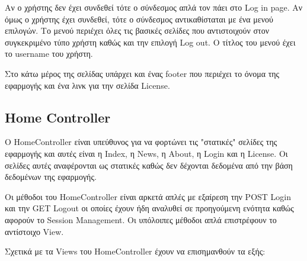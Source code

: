 \documentclass[12pt]{article}
\begin{document}
Αν ο χρήστης δεν έχει συνδεθεί τότε ο σύνδεσμος απλά τον πάει στο Log in page. Αν όμως ο χρήστης έχει συνδεθεί, τότε ο σύνδεσμος αντικαθίσταται με ένα μενού επιλογών. Το μενού περιέχει όλες τις βασικές σελίδες που αντιστοιχούν στον συγκεκριμένο τύπο χρήστη καθώς και την επιλογή Log out. Ο τίτλος του μενού έχει το username του χρήστη.

Στο κάτω μέρος της σελίδας υπάρχει και ένας footer που περιέχει το όνομα της εφαρμογής και ένα λινκ για την σελίδα License.

\subsection{Home Controller}
Ο HomeController είναι υπεύθυνος για να φορτώνει τις "στατικές" σελίδες της εφαρμογής και αυτές είναι η Index, η News, η About, η Login και η License. Οι σελίδες αυτές αναφέρονται ως στατικές καθώς δεν δέχονται δεδομένα από την βάση δεδομένων της εφαρμογής.

Οι μέθοδοι του HomeController είναι αρκετά απλές με εξαίρεση την POST Login και την GET Logout οι οποίες έχουν ήδη αναλυθεί σε προηγούμενη ενότητα καθώς αφορούν το Session Management. Οι υπόλοιπες μέθοδοι απλά επιστρέφουν το αντίστοιχο View.

Σχετικά με τα Views του HomeController έχουν να επισημανθούν τα εξής:
\end{document}
